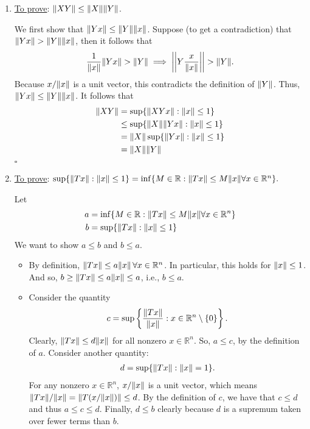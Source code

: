 \documentclass[11pt]{article}
\begin{document}
\begin{enumerate}
	\item \underline{To prove}: $\norm{X Y} \leq \norm{X}\norm{Y}$. 

	We first show that $\norm{Yx} \leq \norm{Y} \norm{x}$. Suppose (to get a contradiction) that $\norm{Yx} > \norm{Y} \norm{x}$, then it follows that
	\begin{align*}
	\frac{1}{\norm{x}} \norm{Y x } > \norm{ Y } \implies \bigg\vert\bigg\vert Y \frac{x}{\norm{x}} \bigg\vert\bigg\vert  > \norm{ Y }.
	\end{align*}
	Because $x/\norm{x}$ is a unit vector, this contradicts the definition of $\norm{Y }$. Thus, $\norm{ Yx} \leq \norm{ Y } \norm{ x}$. It follows that
	\begin{align*}
	\norm{ XY } &= \sup  \{ \norm{ XY x } :\norm{x} \leq 1\}\nonumber\\
	&\leq \sup  \{ \norm{ X } \norm{ Y x } :\norm{x} \leq 1\}\nonumber\\
	&= \norm{ X } \sup  \{ \norm{ Y x } : \norm{x} \leq 1\}\nonumber\\
	&= \norm{ X } \norm{ Y } 
	\end{align*}
	\hfill $\square$
	
	
	
	
	
	\item  \underline{To prove}: $\sup  \{ \norm{ T x } :\norm{x} \leq 1\} = \inf  \{ M \in \mathbb{R} : \norm{ Tx } \leq M \norm{ x  } \forall x \in \mathbb{R}^n \}.$
	
	
	Let 
	\begin{align*}
	a &=  \inf  \{ M \in \mathbb{R} : \norm{ Tx } \leq M \norm{ x  } \forall x \in \mathbb{R}^n \}\nonumber\\
	b &=  \sup  \{ \norm{ T x } : \norm{x} \leq 1\}
	\end{align*}
	We want to show $a\leq b$ and $b \leq a$.
	\begin{itemize}
		\item By definition, $\norm{ Tx } \leq a \norm{x}\, \forall x \in \mathbb{R}^n$. In particular, this holds for $\norm{x} \leq 1$. And so, $b \geq \norm{ T x } \leq a \norm{x} \leq a $, i.e.,  $b \leq a$.  
		\item Consider the quantity
		\begin{align*}
		c = \sup \left\{\frac{\norm{ Tx }}{ \norm{x}}: x \in \mathbb{R}^n \setminus\{ 0\} \right\}.
		\end{align*} 
		Clearly, $\norm{ T x } \leq d\norm{x}$ for all nonzero $x \in \mathbb{R}^n$. So, $a \leq c$, by the definition of $a$. Consider another quantity:
		\begin{align*}
		d = \sup \{\norm{Tx}:\norm{x} = 1\}.
		\end{align*}
		For any nonzero $x\in \mathbb{R}^n$, $x/\norm{x}$ is a unit vector, which means $\norm{Tx}/\norm{x} = \norm{T(x/\norm{x})}  \leq d$. By the definition of $c$, we have that $c \leq d$ and thus $a \leq c \leq d$. Finally, $d \leq b$ clearly because $d$ is a supremum taken over fewer terms than $b$. 
		

\end{itemize}
\end{enumerate}
\end{document}
